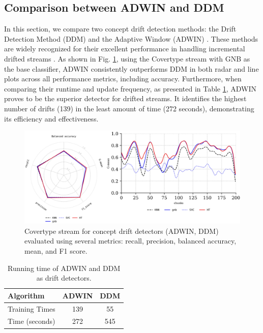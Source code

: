 \subsection{Comparison between ADWIN and DDM}
\label{sec:compared_drift_detector}
In this section, we compare two concept drift detection methods: the Drift Detection Method (DDM) \cite{gama2004learning} and the Adaptive Window (ADWIN) \cite{gama2004learning} \cite{adams2023explainable}. These methods are widely recognized for their excellent performance in handling incremental drifted streams \cite{gama2004learning}\cite{adams2023explainable}\cite{madkour2023historical}\cite{baena2006early}. As shown in Fig. \ref{fig:res5}, using the Covertype stream with GNB as the base classifier, ADWIN consistently outperforms DDM in both radar and line plots across all performance metrics, including accuracy. Furthermore, when comparing their runtime and update frequency, as presented in Table \ref{table:table_4}, ADWIN proves to be the superior detector for drifted streams. It identifies the highest number of drifts (139) in the least amount of time (272 seconds), demonstrating its efficiency and effectiveness.
\begin{figure}[!ht]
	\centering
	\includegraphics[width=1\linewidth]{5_Emerging/images/res4.png}
	\caption{Covertype stream for concept drift detectors (ADWIN, DDM) evaluated using several metrics: recall, precision, balanced accuracy, mean, and F1 score.}

	\label{fig:res5}
\end{figure}
	
\begin{table}[!ht]
	\centering
	\begin{tabular}{|l|c|c|}
		\hline
	\textbf{Algorithm}     & \textbf{ADWIN} & \textbf{DDM}  \\ \hline
Training Times         & 139          & 55                   \\ \hline
Time (seconds)         & 272          & 545                   \\ \hline
	
	\end{tabular}

	\caption{Running time of ADWIN and DDM as drift detectors.}
	\label{table:table_4}
	\end{table}